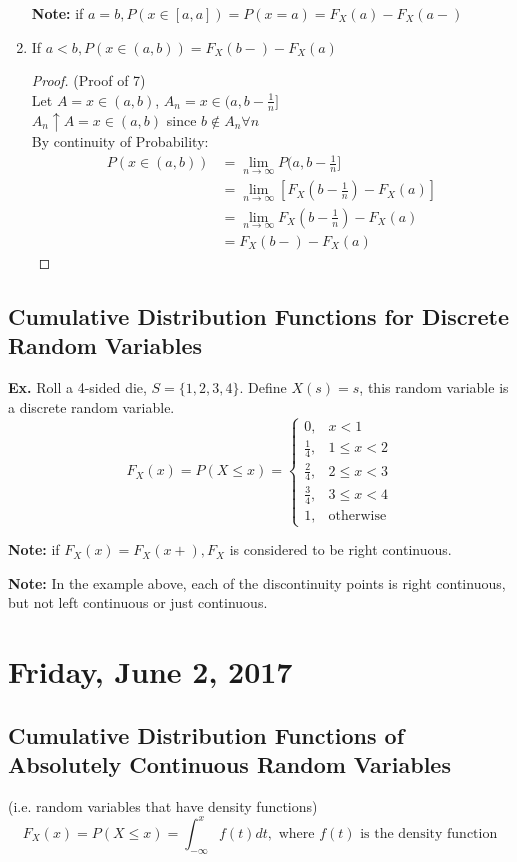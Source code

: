 \documentclass[12pt, twoside]{article}
\begin{document}
\begin{enumerate}
{	\textbf{Note:} if $a=b, P(x \in [a,a]) = P(x=a) = F_X (a) - F_X (a-)$
	}
	\item{
	If $a < b, P(x \in (a,b)) = F_X (b-) - F_X (a)$
	\begin{proof}
		(Proof of 7)\\
		Let $A = x \in (a,b)$, $A_n = x \in (a,b-\frac{1}{n}]$\\
		$A_n \uparrow A = x \in (a,b)$ since $b \not\in A_n \forall n$\\
		By continuity of Probability:
		\begin{align*}
		P(x\in (a,b)) &= \lim_{n\to\infty} P(a,b-\frac{1}{n}]\\
		&= \lim_{n\to\infty} [F_X (b - \frac{1}{n}) - F_X (a)]\\
		&= \lim_{n\to\infty} F_X (b - \frac{1}{n}) - F_X (a)\\
		&= F_X (b-) - F_X (a)
		\end{align*}

	\end{proof}
	}
\end{enumerate}

\subsection{Cumulative Distribution Functions for Discrete Random Variables}

\textbf{Ex.} Roll a 4-sided die, $S = \{ 1,2,3,4 \}$. Define $X(s)=s$, this random variable is a discrete random variable.
$$F_X (x) = P(X \leq x) = \begin{cases}
0, & x < 1\\
\frac{1}{4}, & 1 \leq x < 2\\
\frac{2}{4}, & 2 \leq x < 3\\
\frac{3}{4}, & 3 \leq x < 4\\
1, & \text{otherwise}
\end{cases}
$$

\textbf{Note:} if $F_X (x) = F_X (x+), F_X$ is considered to be right continuous.

\textbf{Note:} In the example above, each of the discontinuity points is right continuous, but not left continuous or just continuous.

\newpage

\section{Friday, June 2, 2017}

\subsection{Cumulative Distribution Functions of Absolutely Continuous Random Variables}
(i.e. random variables that have density functions)
$$F_X (x) = P(X \leq x) = \int^x_{-\infty} f(t) dt, \text{ where $f(t)$ is the density function}$$
\end{document}
